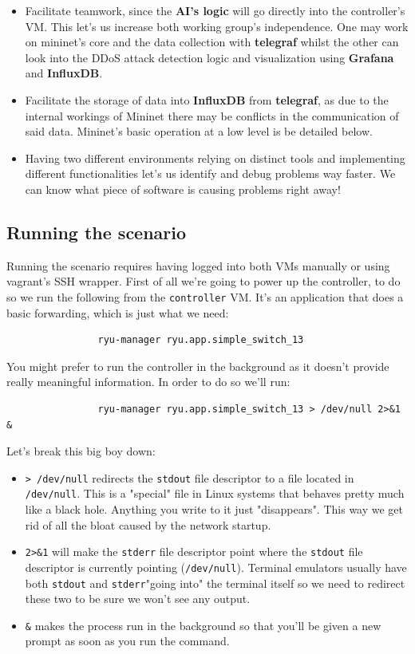 \documentclass[12pt]{report}
\begin{document}
		\begin{itemize}
			\item Facilitate teamwork, since the \textbf{AI's logic} will go directly into the controller's VM. This let's us increase both working group's independence. One may work on mininet's core and the data collection with \textbf{telegraf} whilst the other can look into the DDoS attack detection logic and visualization using \textbf{Grafana} and \textbf{InfluxDB}.
			\item Facilitate the storage of data into \textbf{InfluxDB} from \textbf{telegraf}, as due to the internal workings of Mininet there may be conflicts in the communication of said data. Mininet's basic operation at a low level is be detailed below.
			\item Having two different environments relying on distinct tools and implementing different functionalities let's us identify and debug problems way faster. We can know what piece of software is causing problems right away!
		\end{itemize}

		\subsection{Running the scenario}
			Running the scenario requires having logged into both VMs manually or using vagrant's SSH wrapper. First of all we're going to power up the controller, to do so we run the following from the \texttt{controller} VM. It's an application that does a basic forwarding, which is just what we need:

			\begin{verbatim}
				ryu-manager ryu.app.simple_switch_13
			\end{verbatim}

			You might prefer to run the controller in the background as it doesn't provide really meaningful information. In order to do so we'll run:

			\begin{verbatim}
				ryu-manager ryu.app.simple_switch_13 > /dev/null 2>&1 &
			\end{verbatim}

			Let's break this big boy down:

			\begin{itemize}
				\item \texttt{> /dev/null} redirects the \texttt{stdout} file descriptor to a file located in \texttt{/dev/null}. This is a "special" file in Linux systems that behaves pretty much like a black hole. Anything you write to it just "disappears". This way we get rid of all the bloat caused by the network startup.
				\item \texttt{2>\&1} will make the \texttt{stderr} file descriptor point where the \texttt{stdout} file descriptor is currently pointing (\texttt{/dev/null}). Terminal emulators usually have both \texttt{stdout} and \texttt{stderr}"going into" the terminal itself so we need to redirect these two to be sure we won't see any output.
				\item \texttt{\&} makes the process run in the background so that you'll be given a new prompt as soon as you run the command.
			\end{itemize}
\end{document}
